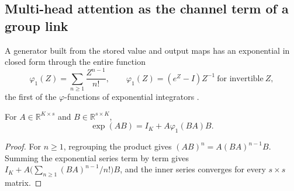 \documentclass[twoside,11pt]{article}
\begin{document}
\subsection{Multi-head attention as the channel term of a group link}
\label{sec:lie_lowrank}

A generator built from the stored value and output maps has an exponential in closed form through the entire function
\begin{equation}
\varphi_1(Z)=\sum_{n\ge1}\frac{Z^{n-1}}{n!},\qquad \varphi_1(Z)=(e^Z-I)Z^{-1}\ \text{for invertible}\ Z,
\label{eq:lie_phi1}
\end{equation}
the first of the $\varphi$-functions of exponential integrators \citep{Hochbruck2010}.

\begin{lemma}
\label{lem:lie_lowrank}
For $A\in\mathbb R^{K\times s}$ and $B\in\mathbb R^{s\times K}$,
\begin{equation}
\exp(AB)=I_K+A\varphi_1(BA)B.
\label{eq:lie_lowrank}
\end{equation}
\end{lemma}
\begin{proof}
For $n\ge1$, regrouping the product gives $(AB)^n=A(BA)^{n-1}B$. Summing the exponential series term by term gives $I_K+A\bigl(\sum_{n\ge1}(BA)^{n-1}/n!\bigr)B$, and the inner series converges for every $s\times s$ matrix.
\end{proof}
\end{document}
